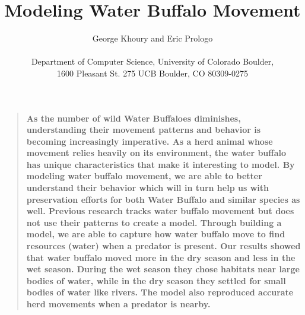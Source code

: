 \documentclass[12pt]{article}
\title{Modeling Water Buffalo Movement}
\author
{George Khoury and Eric Prologo\\
\\
\normalsize{Department of Computer Science, University of Colorado Boulder,}\\
\normalsize{1600 Pleasant St.
275 UCB
Boulder, CO 80309-0275}\\
}
\date{}
\newenvironment{sciabstract}{%
\begin{quote} \bf}
{\end{quote}}
\begin{document}
 


\baselineskip24pt


\maketitle 




\begin{sciabstract}
  As the number of wild Water Buffaloes diminishes, understanding their movement patterns and behavior is becoming increasingly imperative. As a herd animal whose movement relies heavily on its environment, the water buffalo has unique characteristics that make it interesting to model. By modeling water buffalo movement, we are able to better understand their behavior which will in turn help us with preservation efforts for both Water Buffalo and similar species as well. Previous research tracks water buffalo movement but does not use their patterns to create a model. Through building a model, we are able to capture how water buffalo move to find resources (water) when a predator is present. Our results showed that water buffalo moved more in the dry season and less in the wet season. During the wet season they chose habitats near large bodies of water, while in the dry season they settled for small bodies of water like rivers. The model also reproduced accurate herd movements when a predator is nearby. 
\end{sciabstract}



\end{document}
